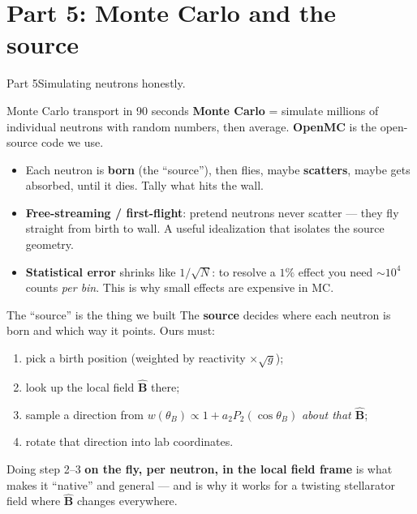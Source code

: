 \documentclass[11pt,aspectratio=169]{beamer}
\newcommand{\key}[1]{\textcolor{key}{\textbf{#1}}}
\newcommand{\bhat}{\hat{\mathbf{B}}}
\begin{document}
\section{Part 5: Monte Carlo and the source}
\begin{frame}{Part 5}\Large Simulating neutrons honestly.\end{frame}

\begin{frame}{Monte Carlo transport in 90 seconds}
\key{Monte Carlo} = simulate millions of individual neutrons with random numbers, then
average. \key{OpenMC} is the open-source code we use.
\begin{itemize}
\item Each neutron is \key{born} (the ``source''), then flies, maybe \key{scatters},
maybe gets absorbed, until it dies. Tally what hits the wall.
\item \key{Free-streaming / first-flight}: pretend neutrons never scatter --- they fly
straight from birth to wall. A useful idealization that isolates the source geometry.
\item \key{Statistical error} shrinks like $1/\sqrt{N}$: to resolve a $1\%$ effect you need
$\sim\!10^4$ counts \emph{per bin}. This is why small effects are expensive in MC.
\end{itemize}
\end{frame}

\begin{frame}{The ``source'' is the thing we built}
The \key{source} decides where each neutron is born and which way it points. Ours must:
\begin{enumerate}
\item pick a birth position (weighted by reactivity $\times\sqrt{g}$);
\item look up the local field $\bhat$ there;
\item sample a direction from $w(\theta_B)\propto 1+a_2 P_2(\cos\theta_B)$ \emph{about that
$\bhat$};
\item rotate that direction into lab coordinates.
\end{enumerate}
Doing step 2--3 \key{on the fly, per neutron, in the local field frame} is what makes it
``native'' and general --- and is why it works for a twisting stellarator field where $\bhat$
changes everywhere.
\end{frame}
\end{document}
